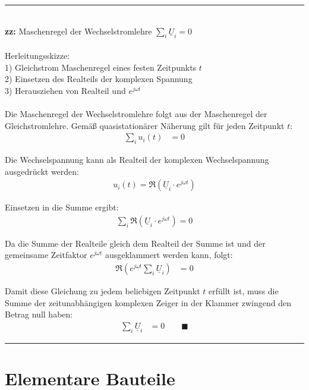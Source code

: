 \documentclass{article}
\newcommand{\lr}[1]{\left(#1\right)}
\begin{document}
{\color{violet}
\hrule
{}\\
	\textbf{zz:} Maschenregel der Wechselstromlehre $\sum_{i} \underline{U}_i = 0$ \\
	\\
	Herleitungsskizze:\\
	1) Gleichstrom Maschenregel eines festen Zeitpunkts $t$ \\
	2) Einsetzen des Realteils der komplexen Spannung \\
	3) Herausziehen von Realteil und $e^{j\omega t}$ \\
	\\
	Die Maschenregel der Wechselstromlehre folgt aus der Maschenregel der Gleichstromlehre. Gemäß quasistationärer Näherung gilt für jeden Zeitpunkt $t$:
		\begin{align*}
			\sum_i u_i(t) &= 0
		\end{align*}
	
	Die Wechselspannung kann als Realteil der komplexen Wechselspannung ausgedrückt werden:
		\begin{align*}
			u_i(t) = \Re \lr{ \underline{U}_i \cdot e^{j\omega t} }
		\end{align*}
	
	
	Einsetzen in die Summe ergibt:
		\begin{align*}
			\sum_i \Re \lr{ \underline{U}_i \cdot e^{j\omega t} } = 0
		\end{align*}
	
	Da die Summe der Realteile gleich dem Realteil der Summe ist und der gemeinsame Zeitfaktor $e^{j\omega t}$ ausgeklammert werden kann, folgt:
		\begin{align*}
			\Re \lr{ e^{j\omega t} \sum_i \underline{U}_i } &= 0
		\end{align*}
	
	Damit diese Gleichung zu jedem beliebigen Zeitpunkt $t$ erfüllt ist, muss die Summe der zeitunabhängigen komplexen Zeiger in der Klammer zwingend den Betrag null haben:
		\begin{align*}
			\sum_i \underline{U}_i &= 0 \qquad \blacksquare
		\end{align*}
\hrule
}


\newpage


\section{Elementare Bauteile}
\end{document}
